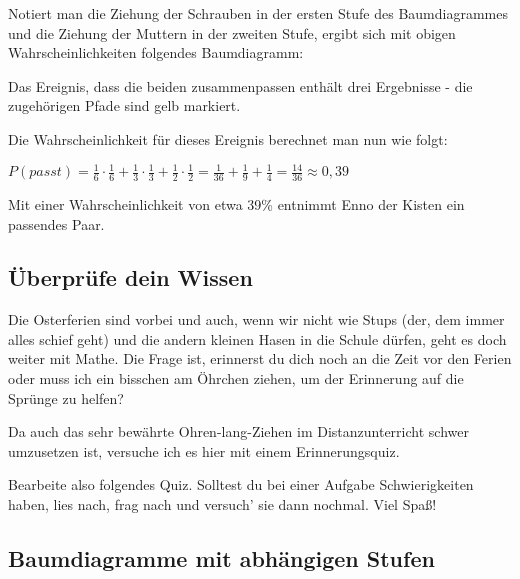 \documentclass[
  ngerman,
]{book}
\begin{document}
Notiert man die Ziehung der Schrauben in der ersten Stufe des Baumdiagrammes und die Ziehung der Muttern in der zweiten Stufe, ergibt sich mit obigen Wahrscheinlichkeiten folgendes Baumdiagramm:

Das Ereignis, dass die beiden zusammenpassen enthält drei Ergebnisse - die zugehörigen Pfade sind gelb markiert.

Die Wahrscheinlichkeit für dieses Ereignis berechnet man nun wie folgt:

\(P(passt)=\frac{1}{6}\cdot\frac{1}{6}+\frac{1}{3}\cdot\frac{1}{3}+\frac{1}{2}\cdot\frac{1}{2}=\frac{1}{36}+\frac{1}{9}+\frac{1}{4}=\frac{14}{36}\approx 0,39\)

Mit einer Wahrscheinlichkeit von etwa 39\% entnimmt Enno der Kisten ein passendes Paar.

\hypertarget{section-131}{%
\subsubsection*{}\label{section-131}}

\hypertarget{uxfcberpruxfcfe-dein-wissen}{%
\subsection*{Überprüfe dein Wissen}\label{uxfcberpruxfcfe-dein-wissen}}

Die Osterferien sind vorbei und auch, wenn wir nicht wie Stups (der, dem immer alles schief geht) und die andern kleinen Hasen in die Schule dürfen, geht es doch weiter mit Mathe. Die Frage ist, erinnerst du dich noch an die Zeit vor den Ferien oder muss ich ein bisschen am Öhrchen ziehen, um der Erinnerung auf die Sprünge zu helfen?

Da auch das sehr bewährte Ohren-lang-Ziehen im Distanzunterricht schwer umzusetzen ist, versuche ich es hier mit einem Erinnerungsquiz.

Bearbeite also folgendes Quiz. Solltest du bei einer Aufgabe Schwierigkeiten haben, lies nach, frag nach und versuch' sie dann nochmal. Viel Spaß!

\hypertarget{section-132}{%
\subsubsection*{}\label{section-132}}

\hypertarget{baumdiagramme-mit-abhuxe4ngigen-stufen}{%
\subsection{Baumdiagramme mit abhängigen Stufen}\label{baumdiagramme-mit-abhuxe4ngigen-stufen}}
\end{document}
